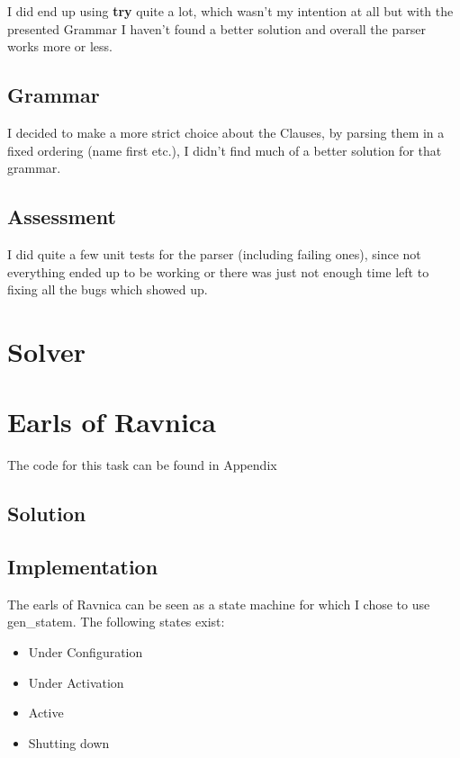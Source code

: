 \documentclass[11pt,a4paper]{article}
\begin{document}
I did end up using \textbf{try} quite a lot, which wasn't my intention at all but with the presented Grammar I haven't found a better solution and overall the parser works more or less.

\subsection{Grammar}
I decided to make a more strict choice about the Clauses, by parsing them in a fixed ordering (name first etc.), I didn't find much of a better solution for that grammar.



\subsection{Assessment}
I did quite a few unit tests for the parser (including failing ones), since not everything ended up to be working or there was just not enough time left to fixing all the bugs which showed up.


\section{Solver}

\section{Earls of Ravnica}
The code for this task can be found in Appendix
\subsection{Solution}
\subsection{Implementation}
The earls of Ravnica can be seen as a state machine for which I chose to use gen\_statem.
The following states exist:
\begin{itemize}
	\item Under Configuration
	\item Under Activation
	\item Active
	\item Shutting down
\end{itemize}
\end{document}
